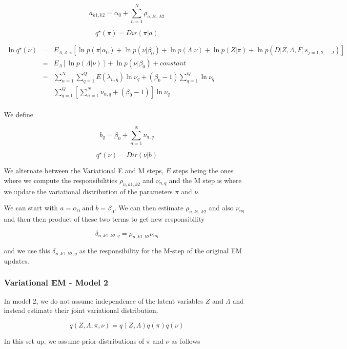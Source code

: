 \documentclass[12pt]{article}
\begin{document}
$$ a_{k1,k2} = \alpha_0 + \sum_{n=1}^{N} \rho_{n,k1,k2} $$

$$ q^{\star} (\pi) = Dir(\pi | a)  $$


\begin{eqnarray} \nonumber
\ln q^{\star} (\nu) & = & E_{\Lambda, Z, \pi} \left [ \ln p(\pi|\alpha_0)+ \ln p(\nu | \beta_0) + \ln p(\Lambda | \nu) + \ln p(Z | \pi) + \ln p(D | Z, \Lambda, F, s_{j=1,2,\cdots,J}) \right ] \\  \nonumber
  & = & E_{\Lambda} \left [ \ln p(\Lambda | \nu) \right] + \ln p(\nu | \beta_0) + constant \\ \nonumber
  & = & \sum_{n=1}^{N}\sum_{q=1}^{Q} E(\lambda_{n,q}) \ln \nu_{q} + (\beta_0 -1) \sum_{q=1}^{Q} \ln \nu_{q} \\ \nonumber
  & = & \sum_{q=1}^{Q} \left [ \sum_{n=1}^{N} \nu_{n,q} + (\beta_0 -1) \right] \ln \nu_{q} \\ \nonumber
\end{eqnarray}

We define 

$$ b_{q} = \beta_0 + \sum_{n=1}^{N} \nu_{n,q} $$

$$ q^{\star} (\nu) = Dir(\nu | b)  $$


We alternate between the Variational E and M steps, $E$ steps being the ones where we compute the responsibilities $\rho_{n,k1,k2}$ and $\nu_{n,q}$ and the M step is where we update the variational distribution of the parameters $\pi$ and $\nu$. 

We can start with $a= \alpha_0$ and $b=\beta_0$. We can then estimate $\rho_{n,k1,k2}$ and also $\nu_{nq}$ and then then product of these two terms to get new responsibility

$$ \delta_{n, k1, k2, q} = \rho_{n, k1, k2} \nu_{nq} $$

and we use this $\delta_{n, k1, k2, q}$ as the responsibility for the M-step of the original EM updates. 

\subsubsection{Variational EM  - Model 2}

In model 2, we do not assume independence of the latent variables $Z$ and $\Lambda$ and instead estimate their joint variational distribution. 

$$ q(Z, \Lambda, \pi, \nu) = q(Z, \Lambda) q(\pi) q(\nu) $$

In this set up, we assume prior distributions of $\pi$ and $\nu$ as follows
\end{document}
